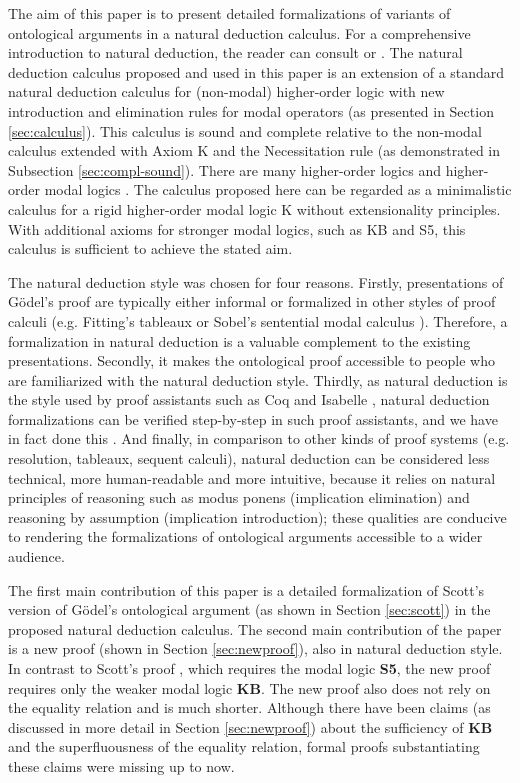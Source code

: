 \documentclass[smallextended]{svjour3}
\begin{document}
The aim of this paper is to present detailed formalizations of variants of ontological arguments in a natural deduction calculus. For a comprehensive introduction to natural deduction, the reader can consult \citep{prawitz} or \citep{gabbay}. The natural deduction calculus proposed and used in this paper is an extension of a standard natural deduction calculus for (non-modal) higher-order logic \citep{BenzmuellerBrownKohlhase} with new introduction and elimination rules for modal operators (as presented in Section \ref{sec:calculus}). This calculus is sound and complete relative to the non-modal calculus extended with Axiom K and the Necessitation rule (as demonstrated in Subsection \ref{sec:compl-sound}). There are many higher-order logics \citep{BenzmuellerBrownKohlhase} and higher-order modal logics \citep{Muskens}. The calculus proposed here can be regarded as a minimalistic calculus for a rigid higher-order modal logic K without extensionality principles. With additional axioms for stronger modal logics, such as KB and S5, this calculus is sufficient to achieve the stated aim.

The natural deduction style was chosen for four reasons. Firstly, presentations of G\"odel's proof are typically either informal or formalized in other styles of proof calculi (e.g. Fitting's tableaux \citep{fitting} or Sobel's sentential modal calculus \citep{sobel2}). Therefore, a formalization in natural deduction is a valuable complement to the existing presentations. Secondly, it makes the ontological proof accessible to people who are familiarized with the natural deduction style. Thirdly, as natural deduction is the style used by proof assistants such as Coq \citep{coq} and Isabelle \citep{isabelle}, natural deduction formalizations can be verified step-by-step in such proof assistants, and we have in fact done this \citep{CSRModalLogicInCoq}. And finally, in comparison to other kinds of proof systems (e.g. resolution, tableaux, sequent calculi), natural deduction can be considered less technical, more human-readable and more intuitive, because it relies on natural principles of reasoning such as modus ponens (implication elimination) and reasoning by assumption (implication introduction); these qualities are conducive to rendering the formalizations of ontological arguments accessible to a wider audience.

The first main contribution of this paper is a detailed formalization of Scott's version \citep{scott} of G\"odel's ontological argument \citep{Goedel} (as shown in Section \ref{sec:scott}) in the proposed natural deduction calculus. The second main contribution of the paper is a new proof (shown in Section \ref{sec:newproof}), also in natural deduction style. In contrast to Scott's proof \citep{scott}, which requires the modal logic \textbf{S5}, the new proof requires only the weaker modal logic \textbf{KB}. The new proof also does not rely on the equality relation and is much shorter. Although there have been claims (as discussed in more detail in Section \ref{sec:newproof}) about the sufficiency of \textbf{KB} and the superfluousness of the equality relation, formal proofs substantiating these claims were missing up to now.
\end{document}
